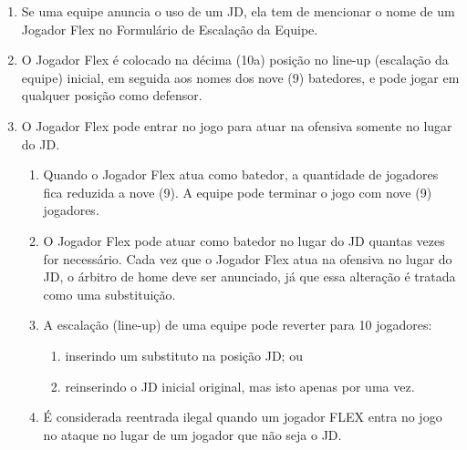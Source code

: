 \begin{enumerate}[label=(\alph*)]
	\item Se uma equipe anuncia o uso de um JD, ela tem de mencionar o nome de um Jogador Flex no Formulário de Escalação da Equipe.
	\item O Jogador Flex é colocado na décima (10a) posição no \gls{line-up} (escalação da equipe) inicial, em seguida aos nomes dos nove (9) batedores, e pode jogar em qualquer posição como defensor.
	\item O Jogador Flex pode entrar no jogo para atuar na ofensiva somente no lugar do JD.
	\begin{enumerate}[label=\roman*.]
		\item Quando o Jogador Flex atua como batedor, a quantidade de jogadores fica  reduzida a nove (9). A equipe pode terminar o jogo com nove (9) jogadores.
		\item O Jogador Flex pode atuar como batedor no lugar do JD quantas vezes for necessário. Cada vez que o Jogador Flex atua na ofensiva no lugar do JD, o árbitro de \gls{home} deve ser anunciado, já que essa alteração é tratada como uma  substituição.
		\item \begin{mdframed}[hidealllines=true,backgroundcolor=blue!20]
			A escalação (\gls{line-up}) de uma equipe pode reverter para 10 jogadores:

			\begin{enumerate}[label=\arabic*)]
				\item inserindo um substituto na posição JD; ou
				\item reinserindo o JD inicial original, mas isto apenas por uma vez.
			\end{enumerate}
		\end{mdframed}
		\item  \begin{mdframed}[hidealllines=true,backgroundcolor=blue!20]
			É considerada reentrada ilegal quando um jogador FLEX entra no jogo no ataque no lugar de um jogador que não seja o JD.
		\end{mdframed}
	\end{enumerate}
\end{enumerate}
